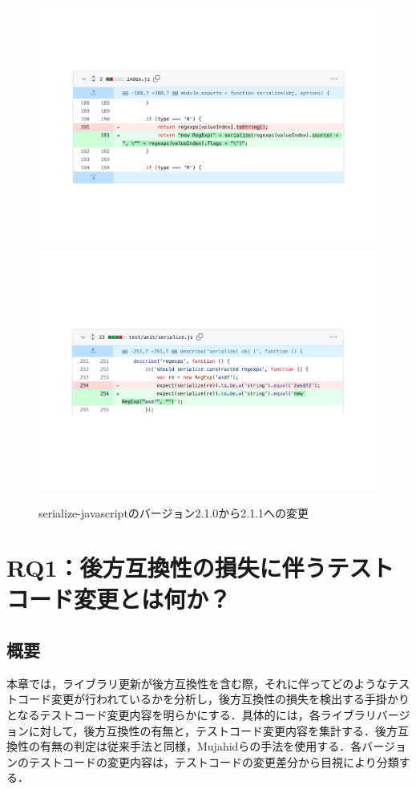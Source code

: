 \documentclass[11pt,dvipdfmx]{jreport}
\begin{document}
\begin{figure}[t]
  \label{fig:motivation}
  \centering
  \includegraphics[width=1.0\linewidth]{fig/rq1/serialize-javascript/index.pdf}
  \includegraphics[width=1.0\linewidth]{fig/rq1/serialize-javascript/index.test.pdf}
  \caption{serialize-javascriptのバージョン2.1.0から2.1.1への変更}
\end{figure}


\chapter{RQ1：後方互換性の損失に伴うテストコード変更とは何か？}\label{chap:rq1}

\section{概要}
本章では，ライブラリ更新が後方互換性を含む際，それに伴ってどのようなテストコード変更が行われているかを分析し，後方互換性の損失を検出する手掛かりとなるテストコード変更内容を明らかにする．具体的には，各ライブラリバージョンに対して，後方互換性の有無と，テストコード変更内容を集計する．後方互換性の有無の判定は従来手法と同様，Mujahidらの手法を使用する．各バージョンのテストコードの変更内容は，テストコードの変更差分から目視により分類する．
\end{document}
